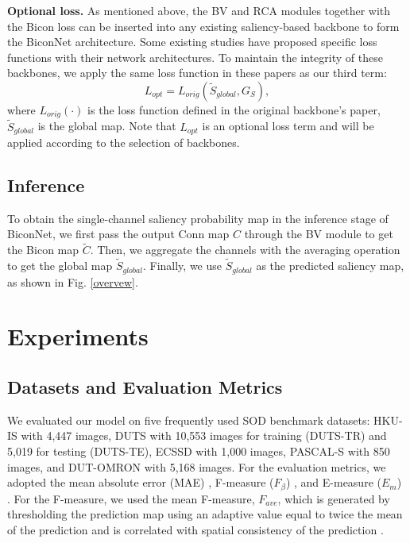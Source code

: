 \documentclass[review]{cvpr}
\begin{document}
\textbf{Optional loss.} As mentioned above, the BV and RCA modules together with the Bicon loss can be inserted into any existing saliency-based backbone to form the BiconNet architecture. Some existing studies \cite{basnet,MINet} have proposed specific loss functions with their network architectures. To maintain the integrity of these backbones, we apply the same loss function in these papers as our third term:
\begin{equation}
{L_{opt}} = {L_{orig}}({\widetilde S_{global}},{G_S}),
\end{equation}
where $L_{orig}(\cdot)$ is the loss function defined in the original backbone’s paper, $\widetilde{S}_{global}$ is the global map. Note that $L_{opt}$ is an optional loss term and will be applied according to the selection of backbones. 
\subsection{Inference}
To obtain the single-channel saliency probability map in the inference stage of BiconNet, we first pass the output Conn map $C$ through the BV module to get the Bicon map $\widetilde{C}$. Then, we aggregate the channels with the averaging operation to get the global map $\widetilde S_{global}$. Finally, we use $\widetilde S_{global}$ as the predicted saliency map, as shown in Fig. \ref{overvew}.


\section{Experiments}
\subsection{Datasets and Evaluation Metrics}
We evaluated our model on five frequently used SOD benchmark datasets: HKU-IS \cite{HKU} with 4,447 images, DUTS \cite{duts} with 10,553 images for training (DUTS-TR) and 5,019 for testing (DUTS-TE), ECSSD \cite{ecssd} with 1,000 images, PASCAL-S \cite{pascal} with 850 images, and DUT-OMRON \cite{omron} with 5,168 images. For the evaluation metrics, we adopted the mean absolute error (MAE) \cite{mae}, F-measure ($F_\beta$)  \cite{F-measure}, and E-measure ($E_m$) \cite{Emeasure}.  For the F-measure, we used the mean F-measure, $F_{ave}$, which is generated by thresholding the prediction map using an adaptive value equal to twice the mean of the prediction and is correlated with spatial consistency of the prediction \cite{cpd}.%
\end{document}
